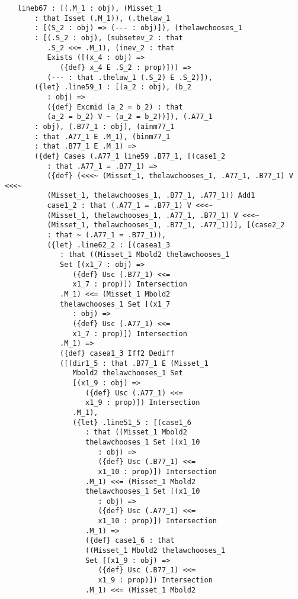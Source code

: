 \documentclass[12pt]{article}
\begin{document}
\begin{verbatim}
   lineb67 : [(.M_1 : obj), (Misset_1 
       : that Isset (.M_1)), (.thelaw_1 
       : [(S_2 : obj) => (--- : obj)]), (thelawchooses_1 
       : [(.S_2 : obj), (subsetev_2 : that 
          .S_2 <<= .M_1), (inev_2 : that 
          Exists ([(x_4 : obj) => 
             ({def} x_4 E .S_2 : prop)])) => 
          (--- : that .thelaw_1 (.S_2) E .S_2)]), 
       ({let} .line59_1 : [(a_2 : obj), (b_2 
          : obj) => 
          ({def} Excmid (a_2 = b_2) : that 
          (a_2 = b_2) V ~ (a_2 = b_2))]), (.A77_1 
       : obj), (.B77_1 : obj), (ainm77_1 
       : that .A77_1 E .M_1), (binm77_1 
       : that .B77_1 E .M_1) => 
       ({def} Cases (.A77_1 line59 .B77_1, [(case1_2 
          : that .A77_1 = .B77_1) => 
          ({def} (<<<~ (Misset_1, thelawchooses_1, .A77_1, .B77_1) V <<<~ 
          (Misset_1, thelawchooses_1, .B77_1, .A77_1)) Add1 
          case1_2 : that (.A77_1 = .B77_1) V <<<~ 
          (Misset_1, thelawchooses_1, .A77_1, .B77_1) V <<<~ 
          (Misset_1, thelawchooses_1, .B77_1, .A77_1))], [(case2_2 
          : that ~ (.A77_1 = .B77_1)), 
          ({let} .line62_2 : [(casea1_3 
             : that ((Misset_1 Mbold2 thelawchooses_1 
             Set [(x1_7 : obj) => 
                ({def} Usc (.B77_1) <<= 
                x1_7 : prop)]) Intersection 
             .M_1) <<= (Misset_1 Mbold2 
             thelawchooses_1 Set [(x1_7 
                : obj) => 
                ({def} Usc (.A77_1) <<= 
                x1_7 : prop)]) Intersection 
             .M_1) => 
             ({def} casea1_3 Iff2 Dediff 
             ([(dir1_5 : that .B77_1 E (Misset_1 
                Mbold2 thelawchooses_1 Set 
                [(x1_9 : obj) => 
                   ({def} Usc (.A77_1) <<= 
                   x1_9 : prop)]) Intersection 
                .M_1), 
                ({let} .line51_5 : [(case1_6 
                   : that ((Misset_1 Mbold2 
                   thelawchooses_1 Set [(x1_10 
                      : obj) => 
                      ({def} Usc (.B77_1) <<= 
                      x1_10 : prop)]) Intersection 
                   .M_1) <<= (Misset_1 Mbold2 
                   thelawchooses_1 Set [(x1_10 
                      : obj) => 
                      ({def} Usc (.A77_1) <<= 
                      x1_10 : prop)]) Intersection 
                   .M_1) => 
                   ({def} case1_6 : that 
                   ((Misset_1 Mbold2 thelawchooses_1 
                   Set [(x1_9 : obj) => 
                      ({def} Usc (.B77_1) <<= 
                      x1_9 : prop)]) Intersection 
                   .M_1) <<= (Misset_1 Mbold2 

\end{verbatim}
\end{document}
